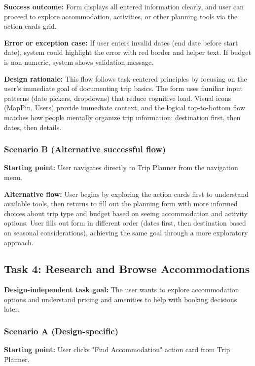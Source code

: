 \documentclass[11pt,a4paper]{article}
\begin{document}
\textbf{Success outcome:} Form displays all entered information clearly, and user can proceed to explore accommodation, activities, or other planning tools via the action cards grid.

\textbf{Error or exception case:} If user enters invalid dates (end date before start date), system could highlight the error with red border and helper text. If budget is non-numeric, system shows validation message.

\textbf{Design rationale:} This flow follows task-centered principles by focusing on the user's immediate goal of documenting trip basics. The form uses familiar input patterns (date pickers, dropdowns) that reduce cognitive load. Visual icons (MapPin, Users) provide immediate context, and the logical top-to-bottom flow matches how people mentally organize trip information: destination first, then dates, then details.

\subsubsection*{Scenario B (Alternative successful flow)}

\textbf{Starting point:} User navigates directly to Trip Planner from the navigation menu.

\textbf{Alternative flow:} User begins by exploring the action cards first to understand available tools, then returns to fill out the planning form with more informed choices about trip type and budget based on seeing accommodation and activity options. User fills out form in different order (dates first, then destination based on seasonal considerations), achieving the same goal through a more exploratory approach.

\subsection*{Task 4: Research and Browse Accommodations}

\textbf{Design-independent task goal:}
The user wants to explore accommodation options and understand pricing and amenities to help with booking decisions later.

\subsubsection*{Scenario A (Design-specific)}

\textbf{Starting point:} User clicks "Find Accommodation" action card from Trip Planner.
\end{document}
